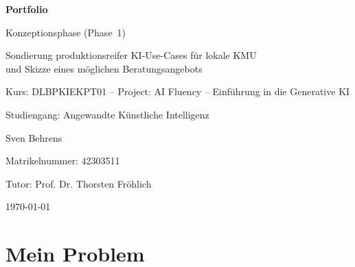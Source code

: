 \documentclass[a4paper,11pt]{article}
\begin{document}
\begin{titlepage}
    \thispagestyle{empty}
    \centering
    \vspace*{5cm}
    {\Huge\bfseries Portfolio \par}
    \vspace{0.3cm}
    {\Large Konzeptionsphase (Phase~1) \par}
    \vspace{1cm}
    {\large Sondierung produktionsreifer KI-Use-Cases für lokale KMU \\ und Skizze eines möglichen Beratungsangebots \par}
    \vspace{1.5cm}
    {\large Kurs: DLBPKIEKPT01 -- Project: AI Fluency -- Einführung in die Generative KI \par}
    \vspace{0.5cm}
    {\large Studiengang: Angewandte Künstliche Intelligenz \par}
    \vspace{0.5cm}
    {\large Sven Behrens \par}
    \vspace{0.5cm}
    {\large Matrikelnummer: 42303511 \par}
    \vspace{0.5cm}
    {\large Tutor: Prof. Dr. Thorsten Fröhlich \par}
    \vspace{0.5cm}
    {\large \today \par}
\end{titlepage}

\setcounter{page}{1}

\tableofcontents
\newpage

\setcounter{page}{1}


\section{Mein Problem}
\end{document}

